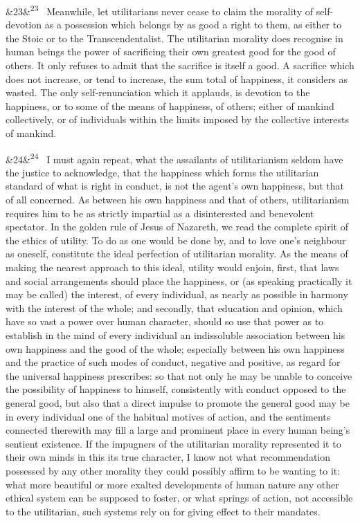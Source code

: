 \documentclass[12pt]{article}
\newcommand{\para}[1][]{\par\noindent\ifx&#1&\else\textsuperscript{\footnotesize #1}~\fi}
\begin{document}
\para[23] Meanwhile, let utilitarians never cease to claim the morality of self-devotion as a possession which belongs by as good a right to them, as either to the Stoic or to the Transcendentalist. The utilitarian morality does recognise in human beings the power of sacrificing their own greatest good for the good of others. It only refuses to admit that the sacrifice is itself a good. A sacrifice which does not increase, or tend to increase, the sum total of happiness, it considers as wasted. The only self-renunciation which it applauds, is devotion to the happiness, or to some of the means of happiness, of others; either of mankind collectively, or of individuals within the limits imposed by the collective interests of mankind.

\para[24] I must again repeat, what the assailants of utilitarianism seldom have the justice to acknowledge, that the happiness which forms the utilitarian standard of what is right in conduct, is not the agent's own happiness, but that of all concerned. As between his own happiness and that of others, utilitarianism requires him to be as strictly impartial as a disinterested and benevolent spectator. In the golden rule of Jesus of Nazareth, we read the complete spirit of the ethics of utility. To do as one would be done by, and to love one's neighbour as oneself, constitute the ideal perfection of utilitarian morality. As the means of making the nearest approach to this ideal, utility would enjoin, first, that laws and social arrangements should place the happiness, or (as speaking practically it may be called) the interest, of every individual, as nearly as possible in harmony with the interest of the whole; and secondly, that education and opinion, which have so vast a power over human character, should so use that power as to establish in the mind of every individual an indissoluble association between his own happiness and the good of the whole; especially between his own happiness and the practice of such modes of conduct, negative and positive, as regard for the universal happiness prescribes: so that not only he may be unable to conceive the possibility of happiness to himself, consistently with conduct opposed to the general good, but also that a direct impulse to promote the general good may be in every individual one of the habitual motives of action, and the sentiments connected therewith may fill a large and prominent place in every human being's sentient existence. If the impugners of the utilitarian morality represented it to their own minds in this its true character, I know not what recommendation possessed by any other morality they could possibly affirm to be wanting to it: what more beautiful or more exalted developments of human nature any other ethical system can be supposed to foster, or what springs of action, not accessible to the utilitarian, such systems rely on for giving effect to their mandates.
\end{document}
